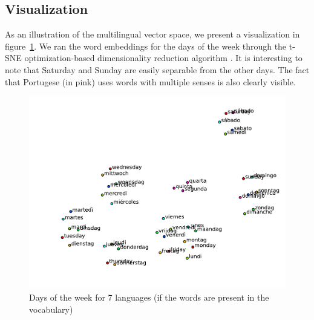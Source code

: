 \subsection{Visualization}

As an illustration of the multilingual vector space, we present a visualization in figure~\ref{f:weekdays}.
We ran the word embeddings for the days of the week through the t-SNE optimization-based dimensionality reduction algorithm \cite{van2008visualizing}.
It is interesting to note that Saturday and Sunday are easily separable from the other days.
The fact that Portugese (in pink) uses words with multiple senses is also clearly visible.

\begin{figure}[ht]
\center
\includegraphics[width=1\linewidth]{figures/weekdays7}
\caption{Days of the week for 7 languages (if the words are present in the vocabulary)}
\label{f:weekdays}
\end{figure}
